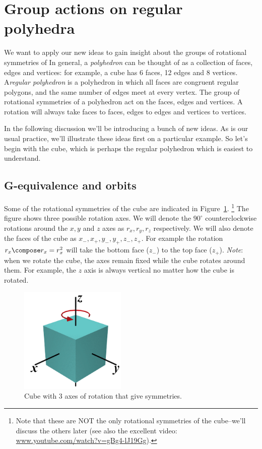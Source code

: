 \section{Group actions on regular polyhedra}\label{ActionsOnPolyhedra}
We want to apply our new ideas to gain insight about the groups of rotational symmetries of   In general, a \emph{polyhedron} can be thought of as a collection of faces, edges and vertices: for example, a cube has 6 faces, 12 edges and 8 vertices. A\emph{regular polyhedron} is a polyhedron in which all faces are congruent regular polygons, and the same number of edges meet at every vertex. The group of rotational symmetries of a polyhedron act on the faces, edges and vertices.  A rotation will always take faces to faces, edges to edges and vertices to vertices. 

In the following discussion we'll be introducing a bunch of new ideas. As is our usual practice, we'll illustrate these ideas first on a particular example. So let's begin with the cube, which is perhaps the regular polyhedron which is easiest to understand.

\subsection{G-equivalence and orbits}
Some of the rotational symmetries of the cube are indicated in Figure~\ref{fig:CubeRot}.
\footnote{Note that these are NOT the only rotational symmetries of the cube--we'll discuss the others later (see also the excellent video: \url{www.youtube.com/watch?v=gBg4-lJ19Gg}).}
The figure shows three possible rotation axes. We will denote the $90^{\circ}$ counterclockwise rotations around the $x,y$ and $z$ axes as $r_x, r_y,r_z$ respectively.  We will also denote the faces of the cube as $x_-, x_+,y_-,y_+,z_-,z_+$.  For example the rotation $r_x\compose r_x=r_x^2$ will take the bottom face ($z_-$) to the top face ($z_+$). \emph{Note}:  when we rotate the cube, the axes remain fixed while the cube rotates around them.  For example, the $z$ axis is always vertical no matter how the cube is rotated.

\begin{figure}[ht]
\begin{center}
\includegraphics[width=2in]{images/AxesOfCube.png}
\caption{Cube with 3 axes of rotation that give symmetries.}\label{fig:CubeRot}
\end{center}
\end{figure}


